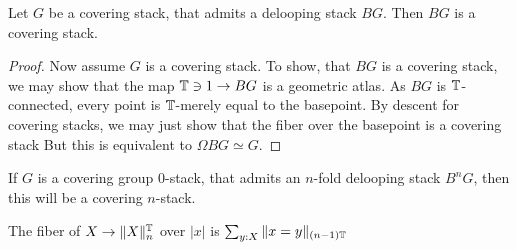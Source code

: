\documentclass{article}
\begin{document}
\begin{lemma}{\label{lemma:deloopingCS}}
	Let $G$ be a covering stack, that admits a delooping stack $B G$. Then $B G$ is a covering stack.
\end{lemma}
\begin{proof}
	Now assume $G$ is a covering stack. 	To show, that  $B G$ is a covering stack, we may show that the map $\mathbb{T} \ni 1 \to B G$ is a geometric atlas. As $B G$ is $\mathbb{T}$-connected, every point is $\mathbb{T}$-merely equal to the basepoint. By descent for covering stacks, we may just show that the fiber over the basepoint is a covering stack
	But this is equivalent to $\Omega B G \simeq G$. 
\end{proof}
\begin{corollary}
	If $G$ is a covering group 0-stack,  that admits an $n$-fold delooping stack $B^n G$, then this will be a covering $n$-stack.
\end{corollary}
\begin{lemma}
	The fiber of $X \to \|X\|_n^{\mathbb{T}}$ over $|x|$ is $\sum_{y : X} \| x = y\|_{(n-1)\mathbb{T}}$
\end{lemma}
\end{document}
